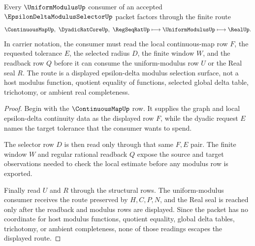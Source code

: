 \begin{theorem}
\label{thm:epsilon-delta-modulus-selector-continuousmap-route}
Every $\UniformModulusUp$ consumer of an accepted $\EpsilonDeltaModulusSelectorUp$ packet factors through the finite route
$$
\ContinuousMapUp,\ \DyadicRatCoreUp,\ \RegSeqRatUp \longmapsto \UniformModulusUp \longmapsto \RealUp .
$$
In carrier notation, the consumer must read the local continuous-map row $F$, the requested tolerance $E$, the selected radius $D$, the finite window $W$, and the readback row $Q$ before it can consume the uniform-modulus row $U$ or the Real seal $R$. The route is a displayed epsilon-delta modulus selection surface, not a host modulus function, quotient equality of functions, selected global delta table, trichotomy, or ambient real completeness.
\end{theorem}
\begin{proof}
Begin with the $\ContinuousMapUp$ row. It supplies the graph and local epsilon-delta continuity data as the displayed row $F$, while the dyadic request $E$ names the target tolerance that the consumer wants to spend.

The selector row $D$ is then read only through that same $F,E$ pair. The finite window $W$ and regular rational readback $Q$ expose the source and target observations needed to check the local estimate before any modulus row is exported.

Finally read $U$ and $R$ through the structural rows. The uniform-modulus consumer receives the route preserved by $H,C,P,N$, and the Real seal is reached only after the readback and modulus rows are displayed. Since the packet has no coordinate for host modulus functions, quotient equality, global delta tables, trichotomy, or ambient completeness, none of those readings escapes the displayed route.
\end{proof}


